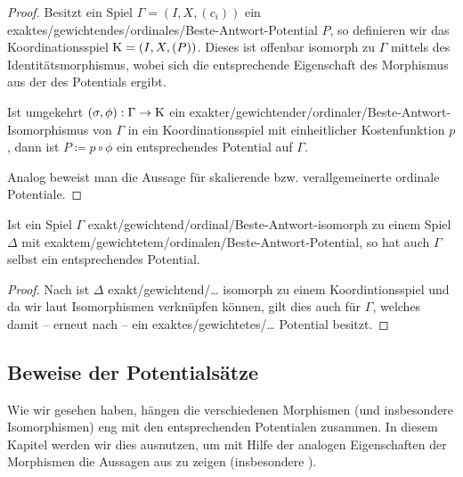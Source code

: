 \begin{proof}
	Besitzt ein Spiel $\Gamma= (I, X, (c_i))$ ein exaktes/gewichtendes/ordinales/Beste-Antwort-Potential $P$, so definieren wir das Koordinationsspiel $\mathrm{K} = (I, X, (P))$. Dieses ist offenbar isomorph zu $\Gamma$ mittels des Identitätsmorphismus, wobei sich die entsprechende Eigenschaft des Morphismus aus der des Potentials ergibt.
	
	Ist umgekehrt $(\sigma, \phi): \Gamma \to \mathrm{K}$ ein exakter/gewichtender/ordinaler/Beste-Antwort-Isomorphismus von $\Gamma$ in ein Koordinationsspiel mit einheitlicher Kostenfunktion $p$, dann ist $P \coloneqq p \circ \phi$ ein entsprechendes Potential auf $\Gamma$.
	
	Analog beweist man die Aussage für skalierende bzw. verallgemeinerte ordinale Potentiale.
\end{proof}

\begin{kor}\label{kor:PotentialeDurchIsosUebertragen}
	Ist ein Spiel $\Gamma$ exakt/gewichtend/ordinal/Beste-Antwort-isomorph zu einem Spiel $\Delta$ mit exaktem/gewichtetem/ordinalen/Beste-Antwort-Potential, so hat auch $\Gamma$ selbst ein entsprechendes Potential.
\end{kor}

\begin{proof}
	Nach  ist $\Delta$ exakt/gewichtend/\dots{} isomorph zu einem Koordintionsspiel und da wir laut  Isomorphismen verknüpfen können, gilt dies auch für $\Gamma$, welches damit -- erneut nach  -- ein exaktes/gewichtetes/\dots{} Potential besitzt.
\end{proof}


\subsection{Beweise der Potentialsätze}\label{sec:Morphismen:Potentialsaetze}

Wie wir gesehen haben, hängen die verschiedenen Morphismen (und insbesondere Isomorphismen) eng mit den entsprechenden Potentialen zusammen. In diesem Kapitel werden wir dies ausnutzen, um mit Hilfe der analogen Eigenschaften der Morphismen die Aussagen aus  zu zeigen (insbesondere ).

